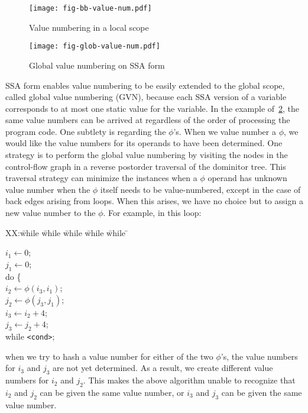 \begin{figure}[t]
\centering
\texttt{[image: fig-bb-value-num.pdf]}
\caption{Value numbering in a local scope}
\label{fig:bb-value-num}
\end{figure}

\begin{figure}[t]
\centering
\texttt{[image: fig-glob-value-num.pdf]}
\caption{Global value numbering on SSA form}
\label{fig:glob-value-num}
\end{figure}

SSA form enables value numbering to be easily extended to the global scope,
called global value numbering (GVN), because each SSA version of a variable
corresponds to at most one static value for the variable.  In the example
of~\ref{fig:glob-value-num}, the same value numbers can be arrived at
regardless of the order of processing the program code.  One subtlety is
regarding the $\phi$'s.  When we value number a $\phi$, we would like the
value numbers for its operands to have been determined.  One strategy is to
perform the global value numbering by visiting the nodes in the control-flow graph in a reverse postorder traversal of the dominitor tree.
This traversal strategy can minimize the instances when a $\phi$ operand has 
unknown value number when the $\phi$ itself needs to be value-numbered,
except in the case of back edges arising from loops.  When this arises,
we have no choice but to assign a new value number to the $\phi$.
For example, in this loop:
\begin{tabbing}
XX:\= while \= while \= while \= while \= while \= \kill

\> \> $i_1 \leftarrow 0$; \\
\> \> $j_1 \leftarrow 0$; \\
\> \> do \{ \\
\> \> \> $i_2 \leftarrow \phi(i_3, i_1)$; \\
\> \> \> $j_2 \leftarrow \phi(j_3, j_1)$; \\
\> \> \> $i_3 \leftarrow i_2 + 4$; \\
\> \> \> $j_3 \leftarrow j_2 + 4$; \\
\> \> while \texttt{<cond>}; \\
\end{tabbing}
when we try to hash a value number for either of the two $\phi$'s, the value
numbers for $i_3$ and $j_3$ are not yet determined.  As a result, we create
different value numbers for $i_2$ and $j_2$.  This makes the above algorithm
unable to recognize that $i_2$ and $j_2$ can be given the same value number,
or $i_3$ and $j_3$ can be given the same value number.


